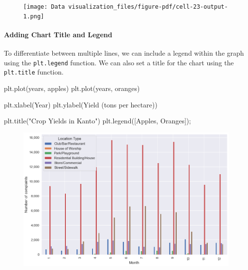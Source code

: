 \documentclass[
  letterpaper,
  DIV=11,
  numbers=noendperiod]{scrreprt}
\let\oldparagraph\paragraph
\renewcommand{\paragraph}[1]{\oldparagraph{#1}\mbox{}}
\newenvironment{Shaded}{\begin{snugshade}}{\end{snugshade}}
\newcommand{\NormalTok}[1]{\textcolor[rgb]{0.00,0.23,0.31}{#1}}
\newcommand{\OperatorTok}[1]{\textcolor[rgb]{0.37,0.37,0.37}{#1}}
\newcommand{\StringTok}[1]{\textcolor[rgb]{0.13,0.47,0.30}{#1}}
\begin{document}
\begin{figure}[H]

{\centering \texttt{[image: Data visualization\_files/figure-pdf/cell-23-output-1.png]}

}

\end{figure}

\hypertarget{adding-chart-title-and-legend}{%
\paragraph{Adding Chart Title and
Legend}\label{adding-chart-title-and-legend}}

To differentiate between multiple lines, we can include a legend within
the graph using the \texttt{plt.legend} function. We can also set a
title for the chart using the \texttt{plt.title} function.

\begin{Shaded}
\begin{Highlighting}[]
\NormalTok{plt.plot(years, apples)}
\NormalTok{plt.plot(years, oranges)}

\NormalTok{plt.xlabel(}\StringTok{\textquotesingle{}Year\textquotesingle{}}\NormalTok{)}
\NormalTok{plt.ylabel(}\StringTok{\textquotesingle{}Yield (tons per hectare)\textquotesingle{}}\NormalTok{)}

\NormalTok{plt.title(}\StringTok{"Crop Yields in Kanto"}\NormalTok{)}
\NormalTok{plt.legend([}\StringTok{\textquotesingle{}Apples\textquotesingle{}}\NormalTok{, }\StringTok{\textquotesingle{}Oranges\textquotesingle{}}\NormalTok{])}\OperatorTok{;}
\end{Highlighting}
\end{Shaded}

\begin{figure}[H]

{\centering \includegraphics{Data visualization_files/figure-pdf/cell-24-output-1.png}

}

\end{figure}
\end{document}
